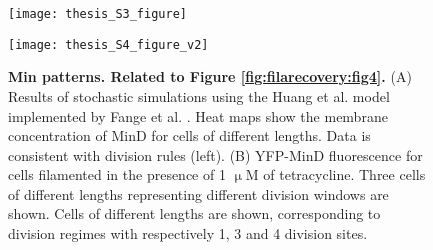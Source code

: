 \begingroup %
\begin{figure}
	\centering
	\texttt{[image: thesis\_S3\_figure]}
\end{figure}	
\clearpage
{}
\endgroup

\newpage


\begin{figure}
	\centering
	\texttt{[image: thesis\_S4\_figure\_v2]}
	\caption{
        \label{fig:filarecovery:figsupp4}
		\textbf{%
            Min patterns. Related to Figure \ref{fig:filarecovery:fig4}.} 
		(A) Results of stochastic simulations using the Huang et al. model implemented by Fange et al. \cite{Huang2003, Fange2006}. Heat maps show the membrane concentration of MinD for cells of different lengths. Data is consistent with division rules (left). (B) YFP-MinD fluorescence for cells filamented in the presence of 1 $\upmu$M of tetracycline. Three cells of different lengths representing different division windows are shown. Cells of different lengths are shown, corresponding to division regimes with respectively 1, 3 and 4 division sites. 
	}	
\end{figure}	



